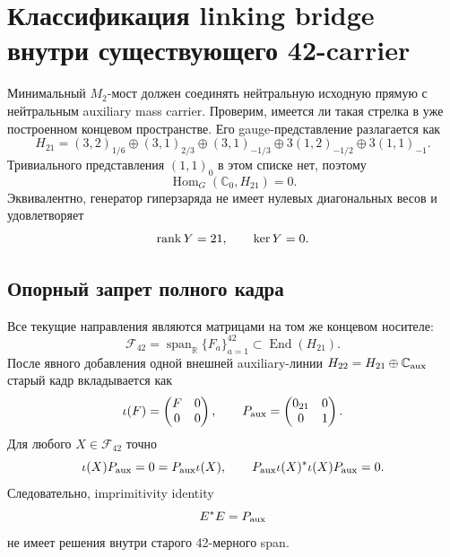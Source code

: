 \chapter{Классификация linking bridge внутри существующего 42-carrier}
\label{ch:v8-baryon-c0-existing-42-carrier-linking-bridge-classification-gate}

Минимальный $M_2$-мост должен соединять нейтральную исходную прямую с
нейтральным auxiliary mass carrier. Проверим, имеется ли такая стрелка в
уже построенном концевом пространстве. Его gauge-представление разлагается
как
\begin{equation}
 H_{21}=(3,2)_{1/6}\oplus(3,1)_{2/3}\oplus(3,1)_{-1/3}
 \oplus3(1,2)_{-1/2}\oplus3(1,1)_{-1}.
 \label{eq:v8-baryon-c0-endpoint-representation-ledger}
\end{equation}
Тривиального представления $(1,1)_0$ в этом списке нет, поэтому
\begin{equation}
 \operatorname{Hom}_G(\mathbb C_0,H_{21})=0.
 \label{eq:v8-baryon-c0-neutral-endpoint-hom-zero}
\end{equation}
Эквивалентно, генератор гиперзаряда не имеет нулевых диагональных весов и
удовлетворяет
\begin{equation}
 \operatorname{rank} Y=21,
 \qquad \ker Y=0.
 \label{eq:v8-baryon-c0-hypercharge-no-neutral-vector}
\end{equation}

\section{Опорный запрет полного кадра}

Все текущие направления являются матрицами на том же концевом носителе:
\begin{equation}
 \mathcal F_{42}=\operatorname{span}_{\mathbb R}\{F_a\}_{a=1}^{42}
 \subset\operatorname{End}(H_{21}).
 \label{eq:v8-baryon-c0-existing-frame-ambient-algebra}
\end{equation}
После явного добавления одной внешней auxiliary-линии
$H_{22}=H_{21}\oplus\mathbb C_{\rm aux}$ старый кадр вкладывается как
\begin{equation}
 \iota(F)=\begin{pmatrix}F&0\\0&0\end{pmatrix},
 \qquad
 P_{\rm aux}=\begin{pmatrix}0_{21}&0\\0&1\end{pmatrix}.
 \label{eq:v8-baryon-c0-old-frame-zero-extension}
\end{equation}
Для любого $X\in\mathcal F_{42}$ точно
\begin{equation}
 \iota(X)P_{\rm aux}=0=P_{\rm aux}\iota(X),
 \qquad
 P_{\rm aux}\iota(X)^*\iota(X)P_{\rm aux}=0.
 \label{eq:v8-baryon-c0-old-frame-annihilates-auxiliary-line}
\end{equation}
Следовательно, imprimitivity identity
\begin{equation}
 E^*E=P_{\rm aux}
 \label{eq:v8-baryon-c0-required-imprimitivity-identity}
\end{equation}
не имеет решения внутри старого 42-мерного span.

